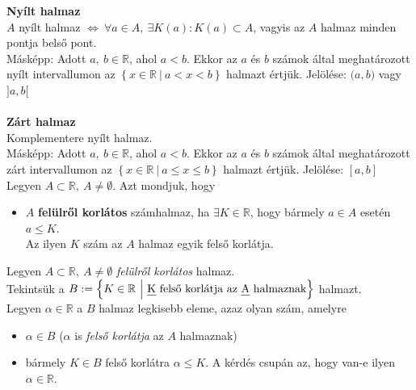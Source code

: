 \documentclass[tikz,12pt,margin=0px]{article}
\begin{document}
    {\footnotesize \noindent {\color{blue} \faLightbulbO\ $\triangleright$ } }
    {\footnotesize

	\noindent \textbf{Nyílt halmaz}\\

	\noindent $A$ nyílt halmaz $\iff\ \forall a \in A,\ \exists K(a): K(a) \subset A$, vagyis az $A$ halmaz minden pontja belső pont.\\
    \noindent Másképp: Adott $a,\ b \in \mathbb{R}$, ahol $a < b$. Ekkor az $a$ és $b$ számok által meghatározott nyílt intervallumon az $\left\{ x \in \mathbb{R}\ \big|\ a < x < b\right\}$ halmazt értjük. Jelölése: $\Big(a,b\Big)$ vagy $\Big]a,b\Big[$\\\\

	\noindent \textbf{Zárt halmaz}\\
	
	\noindent Komplementere nyílt halmaz.\\
    \noindent Másképp: Adott $a,\ b \in \mathbb{R}$, ahol $a < b$. Ekkor az $a$ és $b$ számok által meghatározott zárt intervallumon az $\left\{ x \in \mathbb{R}\ \big|\ a \leq x \leq b\right\}$ halmazt értjük. Jelölése: $[a,b]$\\

    \noindent Legyen $A \subset \mathbb{R},\ A \neq \emptyset$. Azt mondjuk, hogy
    \begin{itemize}
        \item $A$ \textbf{felülről korlátos} számhalmaz, ha $\exists K \in \mathbb{R}$, hogy bármely $a \in A$ esetén $a \leq K$.\\ Az ilyen $K$ szám az $A$ halmaz egyik felső korlátja.\\
    \end{itemize}

    \noindent Legyen $A \subset \mathbb{R},\ A \neq \emptyset$ \emph{felülről korlátos} halmaz. \\
    Tekintsük a $B := \Big\{K \in \mathbb{R}\ \Big|\ \text{\emph{K} felső korlátja az \emph{A} halmaznak}\Big\}$ halmazt.\\
    Legyen $\alpha \in \mathbb{R}$ a $B$ halmaz legkisebb eleme, azaz olyan szám, amelyre
    \begin{itemize}
        \item $\alpha \in B$ ($\alpha$ is \emph{felső korlátja} az $A$ halmaznak)
        \item bármely $K \in B$ felső korlátra $\alpha \leq K$. A kérdés csupán az, hogy van-e ilyen $\alpha \in \mathbb{R}$.
    \end{itemize}

}
\end{document}
